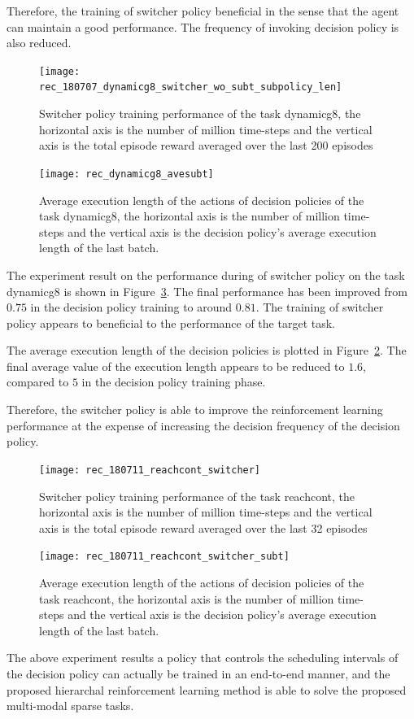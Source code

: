 Therefore, the training of switcher policy beneficial in the sense that the agent can maintain a good performance. The frequency of invoking decision policy is also reduced.
\begin{figure}[!htbp]
	\centering
	\texttt{[image: rec\_180707\_dynamicg8\_switcher\_wo\_subt\_subpolicy\_len]}
	\caption{Switcher policy training performance of the task dynamicg8, the horizontal axis is the number of million time-steps and the vertical axis is the total episode reward averaged over the last 200 episodes}
	\label{fig:rec_dynamicg8_switcher}
\end{figure}

\begin{figure}[!htbp]
	\centering
	\texttt{[image: rec\_dynamicg8\_avesubt]}
	\caption{Average execution length of the actions of decision policies of the task dynamicg8, the horizontal axis is the number of million time-steps and the vertical axis is the decision policy's average execution length of the last batch.}
	\label{fig:rec_dynamicg8_avesubt}
\end{figure}

The experiment result on the performance during of switcher policy on the task dynamicg8 is shown in Figure~\ref{fig:rec_reachcont_switcher}. The final performance has been improved from $0.75$ in the decision policy training to around $0.81$. The training of switcher policy appears to beneficial to the performance of the target task.

The average execution length of the decision policies is plotted in Figure~\ref{fig:rec_dynamicg8_avesubt}. The final average value of the execution length appears to be reduced to $1.6$, compared to $5$ in the decision policy training phase.

Therefore, the switcher policy is able to improve the reinforcement learning performance at the expense of increasing the decision frequency of the decision policy.

\begin{figure}[!htbp]
	\centering
	\texttt{[image: rec\_180711\_reachcont\_switcher]}
	\caption{Switcher policy training performance of the task reachcont, the horizontal axis is the number of million time-steps and the vertical axis is the total episode reward averaged over the last 32 episodes}
	\label{fig:rec_reachcont_switcher}
\end{figure}

\begin{figure}[!htbp]
	\centering
	\texttt{[image: rec\_180711\_reachcont\_switcher\_subt]}
	\caption{Average execution length of the actions of decision policies of the task reachcont, the horizontal axis is the number of million time-steps and the vertical axis is the decision policy's average execution length of the last batch.}
	\label{fig:rec_reachcont_switcher_subt}
\end{figure}

The above experiment results a policy that controls the scheduling intervals of the decision policy can actually be trained in an end-to-end manner, and the proposed hierarchal reinforcement learning method is able to solve the proposed multi-modal sparse tasks.
